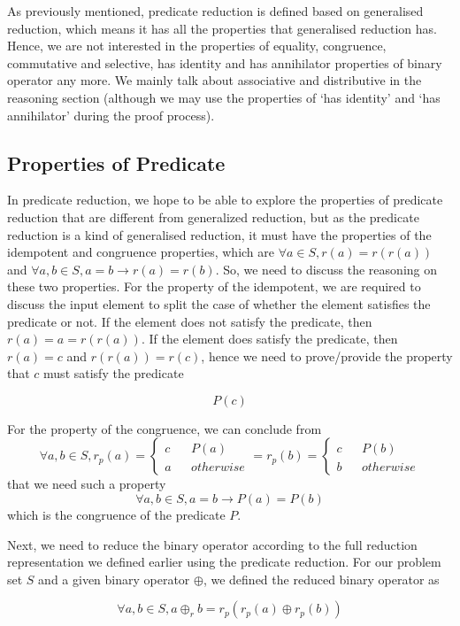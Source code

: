 \documentclass[a4paper,12pt,twoside,openright]{report}
\newcommand{\e}[2]{
\begin{equation}
  \label{#1} 
  #2
\end{equation}
}
\begin{document}
As previously mentioned, predicate reduction is defined based on generalised reduction, which means it has all the properties that generalised reduction has. Hence, we are not interested in the properties of equality, congruence, commutative and selective, has identity and has annihilator properties of binary operator any more.  We mainly talk about associative and distributive in the reasoning section (although we may use the properties of ‘has identity’ and ‘has annihilator’ during the proof process). 

\subsection{Properties of Predicate}
In predicate reduction, we hope to be able to explore the properties of predicate reduction that are different from generalized reduction, but as the predicate reduction is a kind of generalised reduction, it must have the properties of the idempotent and congruence properties, which are $\forall a \in S, r(a) = r(r(a))$ and $\forall a,b\in S, a = b \rightarrow r(a) = r(b)$. So, we need to discuss the reasoning on these two properties. For the property of the idempotent, we are required to discuss the input element to split the case of whether the element satisfies the predicate or not. If the element does not satisfy the predicate, then $r(a) = a = r(r(a))$. If the element does satisfy the predicate, then $r(a) = c$ and $r(r(a)) = r(c)$, hence we need to prove/provide the property that $c$ must satisfy the predicate
\e{pr:proof:p_true}{P(c)}
For the property of the congruence, we can conclude from 
\[\forall a,b \in S, r_p(a)=\left\{
\begin{aligned}
c &  & P(a) \\
a &  & otherwise 
\end{aligned}
\right. = 
r_p(b)=\left\{
\begin{aligned}
c &  & P(b) \\
b &  & otherwise 
\end{aligned}
\right.\] that we need such a property \e{pr:proof:p_cong}{\forall a,b \in S, a = b \rightarrow P(a) = P(b)} which is the congruence of the predicate $P$.

Next, we need to reduce the binary operator according to the full reduction representation we defined earlier using the predicate reduction. For our problem set $S$ and a given binary operator $\oplus$, we defined the reduced binary operator as 
\e{pr:def:binary_operator}{\forall a,b \in S, a \oplus_r b = r_p (r_p(a) \oplus r_p(b))}
\end{document}
